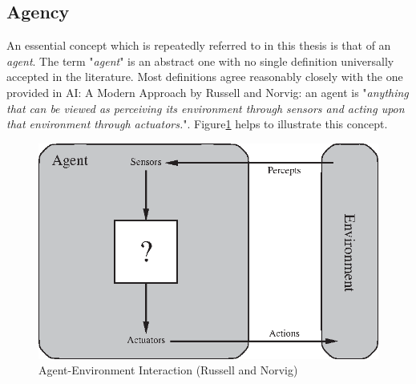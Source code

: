 
\subsection{Agency} \label{AgencySubsection}
An essential concept which is repeatedly referred to in this thesis is that of an \emph{agent}. The term "\textit{agent}" is an abstract one with no single definition universally accepted in the literature. Most definitions agree reasonably closely with the one provided in AI: A Modern Approach by Russell and Norvig: an agent is "\textit{anything that can be viewed as perceiving its environment through sensors and acting upon that environment through actuators.}"\cite{AIAMA}.  Figure\ref{fig:agent_env_interaction} helps to illustrate this concept. \begin{figure}
    \centering
    \includegraphics{Chapters/BackgroundKnowledgeAndRelatedWork/Figs/Vector/agent-environment.eps}
    \caption{Agent-Environment Interaction (Russell and Norvig)\cite[p.~35]{AIAMA}}
    \label{fig:agent_env_interaction}
\end{figure}
